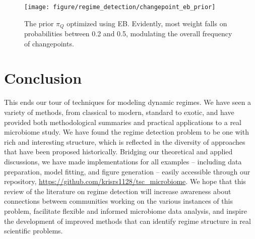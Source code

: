 \begin{figure}
  \centering
  \texttt{[image: figure/regime\_detection/changepoint\_eb\_prior]}
  \caption{The prior $\pi_{Q}$ optimized using EB. Evidently, most weight falls
    on probabilities between 0.2 and 0.5, modulating the overall frequency of
    changepoints.
    \label{fig:changepoint_eb_prior} }
\end{figure}

\section{Conclusion}

This ends our tour of techniques for modeling dynamic regimes. We have seen a
variety of methods, from classical to modern, standard to exotic, and have
provided both methodological summaries and practical applications to a real
microbiome study. We have found the regime detection problem to be one with rich
and interesting structure, which is reflected in the diversity of approaches
that have been proposed historically. Bridging our theoretical and applied
discussions, we have made implementations for all examples -- including data
preparation, model fitting, and figure generation -- easily accessible through
our repository, \url{https://github.com/krisrs1128/tsc\_microbiome}. We hope
that this review of the literature on regime detection will increase awareness
about connections between communities working on the various instances of this
problem, facilitate flexible and informed microbiome data analysis, and inspire
the development of improved methods that can identify regime structure in real
scientific problems.
